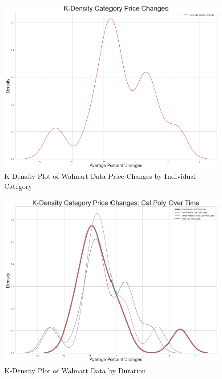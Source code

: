 \newpage
\begin{figure}
\centering
\includegraphics[width=.7\textwidth]{KDensity_Category_Price_Changes.png}
\caption{K-Density Plot of Walmart Data Price Changes by Individual Category}
\label{fig:indiv_walmart_category}
\end{figure}

\newpage
\begin{figure}
\centering
\includegraphics[width=.7\textwidth]{Walmart_Data_by_Length_of_Time.png}
\caption{K-Density Plot of Walmart Data by Duration}
\label{fig:walmart-duration}
\end{figure}
